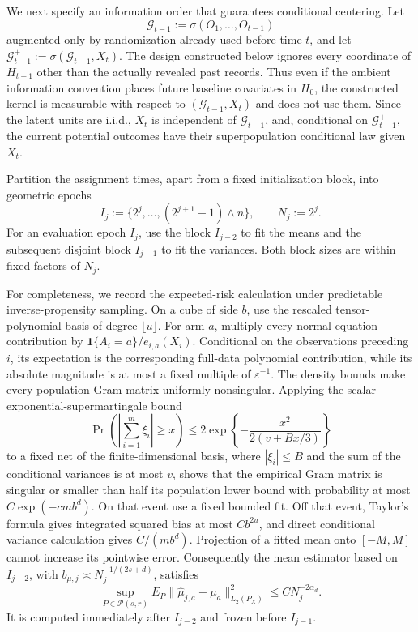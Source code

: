 We next specify an information order that guarantees conditional centering.  Let
\[
\mathcal G_{t-1}:=\sigma(O_1,\ldots,O_{t-1})
\]
augmented only by randomization already used before time \(t\), and let
\(\mathcal G_{t-1}^{+}:=\sigma(\mathcal G_{t-1},X_t)\).  The design constructed below ignores every coordinate of \(H_{t-1}\) other than the actually revealed past records.  Thus even if the ambient information convention places future baseline covariates in \(H_0\), the constructed kernel is measurable with respect to \((\mathcal G_{t-1},X_t)\) and does not use them.  Since the latent units are i.i.d., \(X_t\) is independent of \(\mathcal G_{t-1}\), and, conditional on \(\mathcal G_{t-1}^{+}\), the current potential outcomes have their superpopulation conditional law given \(X_t\).

Partition the assignment times, apart from a fixed initialization block, into geometric epochs
\[
I_j:=\{2^j,\ldots,(2^{j+1}-1)\wedge n\},
\qquad N_j:=2^j.
\tag{5}
\]
For an evaluation epoch \(I_j\), use the block \(I_{j-2}\) to fit the means and the subsequent disjoint block \(I_{j-1}\) to fit the variances.  Both block sizes are within fixed factors of \(N_j\).

For completeness, we record the expected-risk calculation under predictable inverse-propensity sampling.  On a cube of side \(b\), use the rescaled tensor-polynomial basis of degree \(\lfloor u\rfloor\).  For arm \(a\), multiply every normal-equation contribution by
\(\mathbf 1\{A_i=a\}/e_{i,a}(X_i)\).  Conditional on the observations preceding \(i\), its expectation is the corresponding full-data polynomial contribution, while its absolute magnitude is at most a fixed multiple of \(\varepsilon^{-1}\).  The density bounds make every population Gram matrix uniformly nonsingular.  Applying the scalar exponential-supermartingale bound
\[
\Pr\!\left(\left|\sum_{i=1}^m\xi_i\right|\geq x\right)
\leq 2\exp\!\left\{-\frac{x^2}{2(v+Bx/3)}\right\}
\tag{6}
\]
to a fixed net of the finite-dimensional basis, where \(|\xi_i|\leq B\) and the sum of the conditional variances is at most \(v\), shows that the empirical Gram matrix is singular or smaller than half its population lower bound with probability at most
\(C\exp(-cmb^d)\).  On that event use a fixed bounded fit.  Off that event, Taylor's formula gives integrated squared bias at most \(Cb^{2u}\), and direct conditional variance calculation gives \(C/(mb^d)\).  Projection of a fitted mean onto \([-M,M]\) cannot increase its pointwise error.  Consequently the mean estimator based on \(I_{j-2}\), with
\(b_{\mu,j}\asymp N_j^{-1/(2s+d)}\), satisfies
\[
\sup_{P\in\mathcal P(s,r)}
E_P\|\widehat\mu_{j,a}-\mu_a\|_{L_2(P_X)}^2
\leq C N_j^{-2\alpha_d}.
\tag{7}
\]
It is computed immediately after \(I_{j-2}\) and frozen before \(I_{j-1}\).

